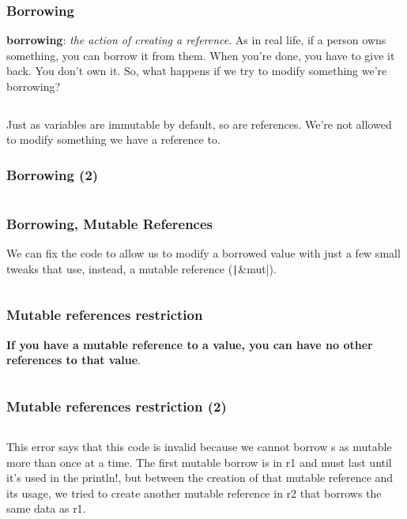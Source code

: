 \documentclass{beamer}
\begin{document}
\begin{frame}[fragile]
	\frametitle{Borrowing}
	\textbf{borrowing}: \textit{the action of creating a reference}.
	As in real life, if a person owns something, you can borrow it from them. When you’re done, you have to give it back. You don’t own it. So, what happens if we try to modify something we’re borrowing?
	\inputminted{rust}{./code/borrowing.rs}
	
	\small
	Just as variables are immutable by default, so are references. We’re not allowed to modify something we have a reference to.
\end{frame}

\begin{frame}[fragile]
	\frametitle{Borrowing (2)}
	\inputminted{shell}{./code/borrowing.shell}
\end{frame}


\begin{frame}[fragile]
	\frametitle{Borrowing, Mutable References}
	We can fix the code to allow us to modify a borrowed value with just a few small tweaks that use, instead, a mutable reference (\texttt|&mut|).
	\inputminted{rust}{./code/borrowing-mut-ref.rs}
\end{frame}


\begin{frame}[fragile]
	\frametitle{Mutable references restriction}
	\textbf{If you have a mutable reference to a value, you can have no other references to that value}. 
	\inputminted{rust}{./code/borrowing-mut-ref-err1.rs}
\end{frame}

\begin{frame}[fragile]
	\frametitle{Mutable references restriction (2)}
	\inputminted[fontsize=\scriptsize]{shell}{./code/borrowing-mut-ref-err1.shell}
	
	\scriptsize
	This error says that this code is invalid because we cannot borrow s as mutable more than once at a time. The first mutable borrow is in r1 and must last until it’s used in the println!, but between the creation of that mutable reference and its usage, we tried to create another mutable reference in r2 that borrows the same data as r1.
	
\end{frame}
\end{document}
